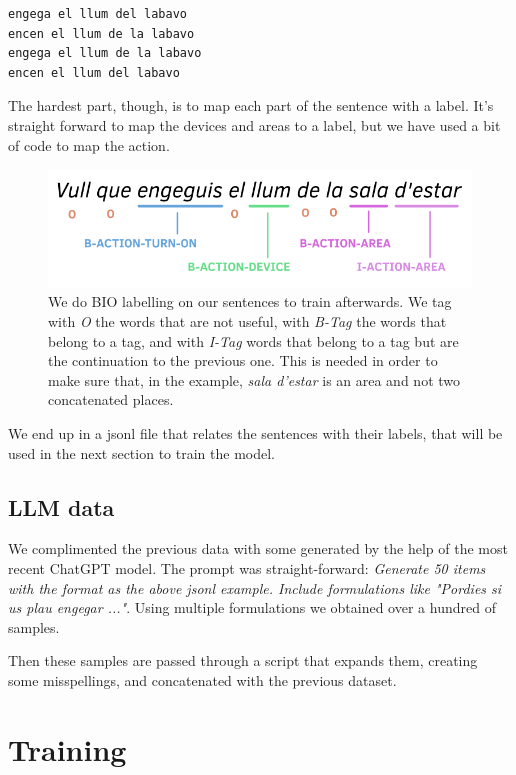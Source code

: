 \documentclass{article}
\begin{document}
\begin{verbatim}
engega el llum del labavo
encen el llum de la labavo
engega el llum de la labavo
encen el llum del labavo
\end{verbatim}

The hardest part, though, is to map each part of the sentence with a label. It's straight forward to map the devices and areas to a label, but we have used a bit of code to map the action.

\begin{figure}[H]
    \centering
    \includegraphics[width=0.75\linewidth]{bio_example.png}
    \caption{We do BIO labelling on our sentences to train afterwards. We tag with \textit{O} the words that are not useful, with \textit{B-Tag} the words that belong to a tag, and with \textit{I-Tag} words that belong to a tag but are the continuation to the previous one. This is needed in order to make sure that, in the example, \textit{sala d'estar} is an area and not two concatenated places.}
    \label{fig:bio-example}
\end{figure}

We end up in a jsonl file that relates the sentences with their labels, that will be used in the next section to train the model.

\subsection{LLM data}

We complimented the previous data with some generated by the help of the most recent ChatGPT model. The prompt was straight-forward: \textit{Generate 50 items with the format as the above jsonl example. Include formulations like "Pordies si us plau engegar ..."}. Using multiple formulations we obtained over a hundred of samples.

Then these samples are passed through a script that expands them, creating some misspellings, and concatenated with the previous dataset.

\section{Training}
\end{document}
